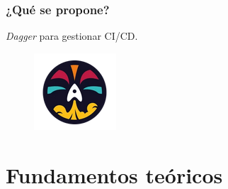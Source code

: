 \documentclass{beamer}
\begin{document}
\begin{frame}
    \frametitle{¿Qué se propone?}

    \begin{center}
        {\it Dagger} para gestionar CI/CD.
    \end{center}
    \begin{figure}
        \includegraphics[scale=1.2]{figuras/Dagger_logo}
    \end{figure}
\end{frame}

\section{Fundamentos teóricos}
\end{document}
